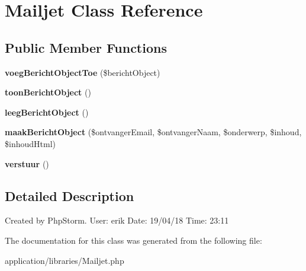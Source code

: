 \hypertarget{class_mailjet}{}\section{Mailjet Class Reference}
\label{class_mailjet}
\subsection*{Public Member Functions}
\begin{DoxyCompactItemize}
\item 
\mbox{\label{class_mailjet_a90fb5991adce9939bcac696bf2447d50}} 
{\bfseries voeg\+Bericht\+Object\+Toe} (\$bericht\+Object)
\item 
\mbox{\label{class_mailjet_a7a446905547aa3e5b8c294392789acf7}} 
{\bfseries toon\+Bericht\+Object} ()
\item 
\mbox{\label{class_mailjet_a6f502ce496b6d10e1ee28a9a1c257120}} 
{\bfseries leeg\+Bericht\+Object} ()
\item 
\mbox{\label{class_mailjet_a0abda60420d420bfe4e6f679eb0dec2e}} 
{\bfseries maak\+Bericht\+Object} (\$ontvanger\+Email, \$ontvanger\+Naam, \$onderwerp, \$inhoud, \$inhoud\+Html)
\item 
\mbox{\label{class_mailjet_abc7aefe96831182f37ef67ef34e62527}} 
{\bfseries verstuur} ()
\end{DoxyCompactItemize}


\subsection{Detailed Description}
Created by Php\+Storm. User\+: erik Date\+: 19/04/18 Time\+: 23\+:11 

The documentation for this class was generated from the following file\+:\begin{DoxyCompactItemize}
\item 
application/libraries/Mailjet.\+php\end{DoxyCompactItemize}
